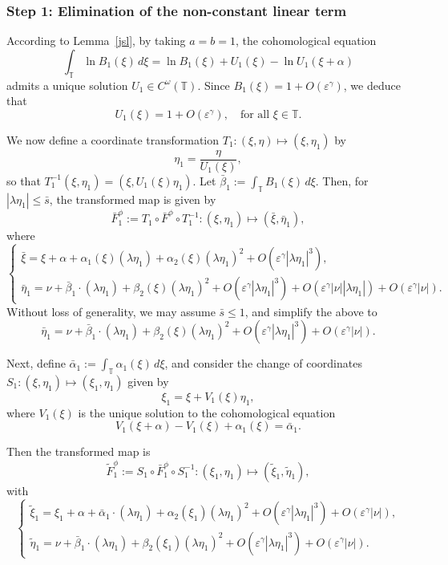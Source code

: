 \documentclass{amsart}
\theoremstyle{definition}
\begin{document}
\subsubsection{Step 1: Elimination of the non-constant linear term}

According to Lemma~\ref{jsl}, by taking $a = b = 1$, the cohomological equation
\[
\int_{\mathbb{T}} \ln B_1(\xi)\, d\xi = \ln B_1(\xi) + U_1(\xi) - \ln U_1(\xi + \alpha)
\]
admits a unique solution $U_1 \in C^\omega(\mathbb{T})$. Since $B_1(\xi) = 1 + O(\varepsilon^\gamma)$, we deduce that
\[
U_1(\xi) = 1 + O(\varepsilon^\gamma), \quad \text{for all } \xi \in \mathbb{T}.
\]

We now define a coordinate transformation $T_1: (\xi, \eta) \mapsto (\xi, \eta_1)$ by
\[
\eta_1 = \frac{\eta}{U_1(\xi)},
\]
so that $T_1^{-1}(\xi, \eta_1) = (\xi, U_1(\xi)\eta_1)$. Let $\bar{\beta}_1 := \int_\mathbb{T} B_1(\xi)\, d\xi$. Then, for $|\lambda \eta_1| \leq \bar{s}$, the transformed map is given by
\[
\bar{F}^\phi_1 := T_1 \circ \bar{F}^\phi \circ T_1^{-1} : (\xi, \eta_1) \mapsto (\bar{\xi}, \bar{\eta}_1),
\]
where
\[
\left\{
\begin{array}{ll}
\bar{\xi} = \xi + \alpha + \alpha_1(\xi)(\lambda \eta_1) + \alpha_2(\xi)(\lambda \eta_1)^2 + O(\varepsilon^\gamma |\lambda \eta_1|^3), \\
\bar{\eta}_1 = \nu + \bar{\beta}_1 \cdot (\lambda \eta_1) + \beta_2(\xi)(\lambda \eta_1)^2 + O(\varepsilon^\gamma |\lambda \eta_1|^3) + O(\varepsilon^\gamma |\nu| |\lambda \eta_1|) + O(\varepsilon^\gamma |\nu|).
\end{array}
\right.
\]
Without loss of generality, we may assume $\bar{s} \leq 1$, and simplify the above to
\[
\bar{\eta}_1 = \nu + \bar{\beta}_1 \cdot (\lambda \eta_1) + \beta_2(\xi)(\lambda \eta_1)^2 + O(\varepsilon^\gamma |\lambda \eta_1|^3) + O(\varepsilon^\gamma |\nu|).
\]

Next, define $\bar{\alpha}_1 := \int_\mathbb{T} \alpha_1(\xi)\, d\xi$, and consider the change of coordinates $S_1: (\xi, \eta_1) \mapsto (\xi_1, \eta_1)$ given by
\[
\xi_1 = \xi + V_1(\xi) \eta_1,
\]
where $V_1(\xi)$ is the unique solution to the cohomological equation
\[
V_1(\xi + \alpha) - V_1(\xi) + \alpha_1(\xi) = \bar{\alpha}_1.
\]

Then the transformed map is
\[
\tilde{F}_1^\phi := S_1 \circ \bar{F}_1^\phi \circ S_1^{-1} : (\xi_1, \eta_1) \mapsto (\tilde{\xi}_1, \tilde{\eta}_1),
\]
with
\[
\left\{
\begin{array}{ll}
\tilde{\xi}_1 = \xi_1 + \alpha + \bar{\alpha}_1 \cdot (\lambda \eta_1) + \alpha_2(\xi_1)(\lambda \eta_1)^2 + O(\varepsilon^\gamma |\lambda \eta_1|^3) + O(\varepsilon^\gamma |\nu|), \\
\tilde{\eta}_1 = \nu + \bar{\beta}_1 \cdot (\lambda \eta_1) + \beta_2(\xi_1)(\lambda \eta_1)^2 + O(\varepsilon^\gamma |\lambda \eta_1|^3) + O(\varepsilon^\gamma |\nu|).
\end{array}
\right.
\]
\end{document}
